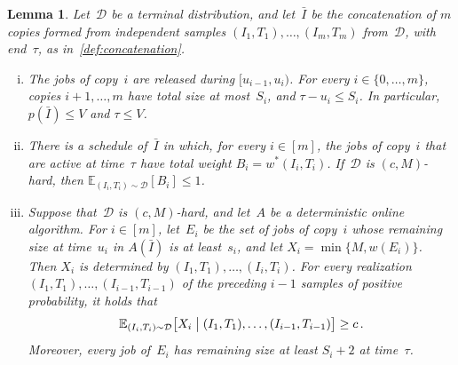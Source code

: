 \documentclass[11pt,letterpaper]{article}
\newtheorem{lemma}[theorem]{Lemma}
\theoremstyle{definition}
\theoremstyle{remark}
\newcommand{\E}{\mathbb{E}}
\newcommand{\cD}{\mathcal{D}}
\begin{document}
\begin{lemma}\label{lem:copies}
Let~$\cD$ be a terminal distribution, and let~$\bar I$ be the concatenation of $m$ copies formed from independent samples $(I_1,T_1),\dots,(I_m,T_m)$ from~$\cD$, with end~$\tau$, as in~\cref{def:concatenation}.
\begin{enumerate}[(i)]
\item\label{it:geometry} The jobs of copy~$i$ are released during $[u_{i-1},u_i)$. For every $i\in\{0,\dots,m\}$, copies $i+1,\dots,m$ have total size at most~$S_i$, and $\tau-u_i\le S_i$. In particular, $p(\bar I)\le V$ and $\tau\le V$.
\item\label{it:offline} There is a schedule of~$\bar I$ in which, for every $i\in[m]$, the jobs of copy~$i$ that are active at time~$\tau$ have total weight $B_i=w^*(I_i,T_i)$. If~$\cD$ is $(c,M)$-hard, then $\E_{(I_i,T_i)\sim\cD}[B_i]\le1$.
\item\label{it:online} Suppose that~$\cD$ is $(c,M)$-hard, and let~$A$ be a deterministic online algorithm. For $i\in[m]$, let~$E_i$ be the set of jobs of copy~$i$ whose remaining size at time~$u_i$ in $A(\bar I)$ is at least~$s_i$, and let $X_i=\min\{M,w(E_i)\}$. Then $X_i$ is determined by $(I_1,T_1),\dots,(I_i,T_i)$. For every realization $(I_1,T_1),\ldots,(I_{i-1},T_{i-1})$ of the preceding $i-1$ samples of positive probability, it holds that
\begin{equation*}
  \E_{(I_i,T_i)\sim\cD}\bigl[X_i\bigm|(I_1,T_1),\dots,(I_{i-1},T_{i-1})\bigr]\ge c\,.
\end{equation*}
Moreover, every job of~$E_i$ has remaining size at least $S_i+2$ at time~$\tau$.
\end{enumerate}
\end{lemma}
\end{document}

